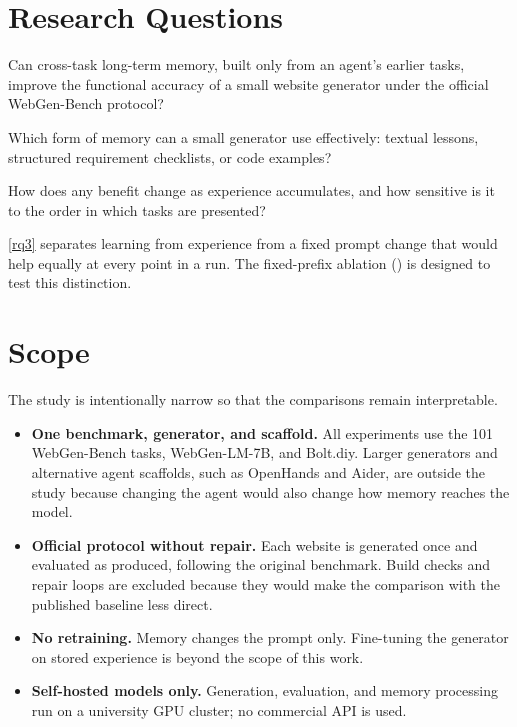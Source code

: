 \section{Research Questions}
\begin{questions}[itemindent=1.5em]
    \item Can cross-task long-term memory, built only from an agent's earlier tasks, improve the functional accuracy of a small website generator under the official WebGen-Bench protocol? \label{rq1}
    \item Which form of memory can a small generator use effectively: textual lessons, structured requirement checklists, or code examples? \label{rq2}
    \item How does any benefit change as experience accumulates, and how sensitive is it to the order in which tasks are presented? \label{rq3}
\end{questions}

\ref{rq3} separates learning from experience from a fixed prompt change that would help equally at every point in a run. The fixed-prefix ablation () is designed to test this distinction.

\section{Scope}
The study is intentionally narrow so that the comparisons remain interpretable.
\begin{itemize}
    \item \textbf{One benchmark, generator, and scaffold.} All experiments use the 101 WebGen-Bench tasks, WebGen-LM-7B, and Bolt.diy. Larger generators and alternative agent scaffolds, such as OpenHands and Aider, are outside the study because changing the agent would also change how memory reaches the model.
    \item \textbf{Official protocol without repair.} Each website is generated once and evaluated as produced, following the original benchmark. Build checks and repair loops are excluded because they would make the comparison with the published baseline less direct.
    \item \textbf{No retraining.} Memory changes the prompt only. Fine-tuning the generator on stored experience is beyond the scope of this work.
    \item \textbf{Self-hosted models only.} Generation, evaluation, and memory processing run on a university GPU cluster; no commercial API is used.
\end{itemize}

